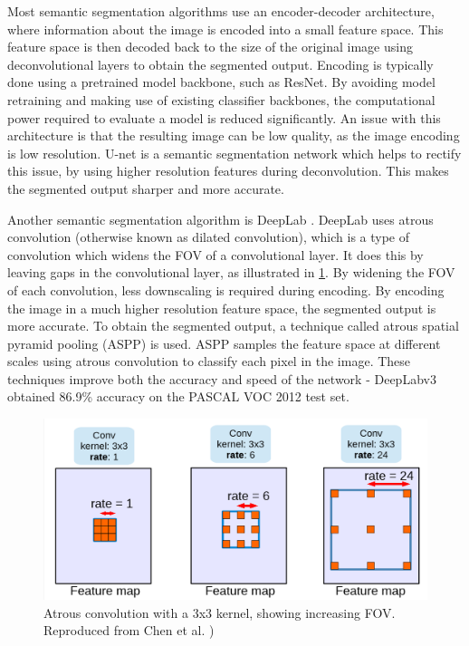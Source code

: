 \documentclass[12pt]{article}
\begin{document}
Most semantic segmentation algorithms use an encoder-decoder architecture, where information about the image is encoded into a small feature space.
This feature space is then decoded back to the size of the original image using deconvolutional layers to obtain the segmented output.
Encoding is typically done using a pretrained model backbone, such as ResNet. By avoiding model retraining and making use of
existing classifier backbones, the computational power required to evaluate a model is reduced significantly.
An issue with this architecture is that the resulting image can be low quality, as the image encoding is low resolution.
U-net \cite{ronnebergerUNetConvolutionalNetworks2015} is a semantic segmentation network which helps to rectify this issue,
by using higher resolution features during deconvolution.
This makes the segmented output sharper and more accurate.

Another semantic segmentation algorithm is DeepLab \cite{chenSemanticImageSegmentation2014}\cite{chenDeepLabSemanticImage2016}\cite{chenRethinkingAtrousConvolution2017}.
DeepLab uses atrous convolution (otherwise known as dilated convolution), which is a type of convolution which widens the FOV of a convolutional layer.
It does this by leaving gaps in the convolutional layer, as illustrated in \cref{fig:atrous_convolution}.
By widening the FOV of each convolution, less downscaling is required during encoding. By encoding the image in a much higher resolution feature space,
the segmented output is more accurate.
To obtain the segmented output, a technique called atrous spatial pyramid pooling (ASPP) is used. ASPP samples the feature space at different
scales using atrous convolution to classify each pixel in the image.
These techniques improve both the accuracy and speed of the network - DeepLabv3 obtained 86.9\% accuracy on the PASCAL VOC 2012 test set.

\begin{figure}[H]
    \centering
    \includegraphics[width=0.6\linewidth]{images/atrous_convolution.png}
    \caption{Atrous convolution with a 3x3 kernel, showing increasing FOV. Reproduced from Chen et al. \cite{chenRethinkingAtrousConvolution2017})}
    \label{fig:atrous_convolution}
\end{figure}
\end{document}
